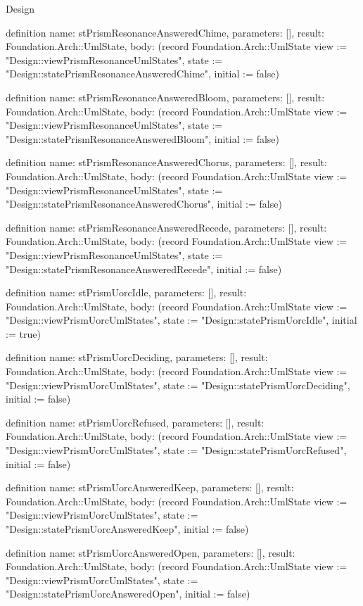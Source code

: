 \begin{lexlean}{Design}
\begin{semanticmodule}
definition{
  name: stPrismResonanceAnsweredChime,
  parameters: [],
  result: Foundation.Arch::UmlState,
  body: (record Foundation.Arch::UmlState {view := "Design::viewPrismResonanceUmlStates", state := "Design::statePrismResonanceAnsweredChime", initial := false})
}

definition{
  name: stPrismResonanceAnsweredBloom,
  parameters: [],
  result: Foundation.Arch::UmlState,
  body: (record Foundation.Arch::UmlState {view := "Design::viewPrismResonanceUmlStates", state := "Design::statePrismResonanceAnsweredBloom", initial := false})
}

definition{
  name: stPrismResonanceAnsweredChorus,
  parameters: [],
  result: Foundation.Arch::UmlState,
  body: (record Foundation.Arch::UmlState {view := "Design::viewPrismResonanceUmlStates", state := "Design::statePrismResonanceAnsweredChorus", initial := false})
}

definition{
  name: stPrismResonanceAnsweredRecede,
  parameters: [],
  result: Foundation.Arch::UmlState,
  body: (record Foundation.Arch::UmlState {view := "Design::viewPrismResonanceUmlStates", state := "Design::statePrismResonanceAnsweredRecede", initial := false})
}

definition{
  name: stPrismUorcIdle,
  parameters: [],
  result: Foundation.Arch::UmlState,
  body: (record Foundation.Arch::UmlState {view := "Design::viewPrismUorcUmlStates", state := "Design::statePrismUorcIdle", initial := true})
}

definition{
  name: stPrismUorcDeciding,
  parameters: [],
  result: Foundation.Arch::UmlState,
  body: (record Foundation.Arch::UmlState {view := "Design::viewPrismUorcUmlStates", state := "Design::statePrismUorcDeciding", initial := false})
}

definition{
  name: stPrismUorcRefused,
  parameters: [],
  result: Foundation.Arch::UmlState,
  body: (record Foundation.Arch::UmlState {view := "Design::viewPrismUorcUmlStates", state := "Design::statePrismUorcRefused", initial := false})
}

definition{
  name: stPrismUorcAnsweredKeep,
  parameters: [],
  result: Foundation.Arch::UmlState,
  body: (record Foundation.Arch::UmlState {view := "Design::viewPrismUorcUmlStates", state := "Design::statePrismUorcAnsweredKeep", initial := false})
}

definition{
  name: stPrismUorcAnsweredOpen,
  parameters: [],
  result: Foundation.Arch::UmlState,
  body: (record Foundation.Arch::UmlState {view := "Design::viewPrismUorcUmlStates", state := "Design::statePrismUorcAnsweredOpen", initial := false})
}


\end{semanticmodule}
\end{lexlean}
